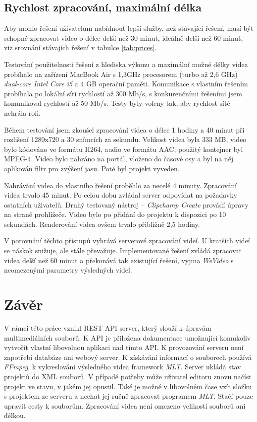 \section{Rychlost zpracování, maximální délka}
Aby mohlo řešení uživatelům nabídnout lepší služby, než stávající řešení, musí být schopné zpracovat video o délce delší než 30 minut, ideálně delší než 60 minut, viz srovnání stávajích řešení v tabulce \ref{tab:prices}.

Testování použitelnosti řešení z hlediska výkonu a maximální možné délky videa probíhalo na zařízení MacBook Air s 1,3GHz procesorem (turbo až 2,6 GHz) \textit{dual-core Intel Core i5} a 4 GB operační paměti. Komunikace s vlastním řešením probíhala po lokální síti rychlostí až 300 Mb/s, s konkurenčními řešeními jsem komunikoval rychlostí až 50 Mb/s. Testy byly voleny tak, aby rychlost sítě nehrála roli.

Během testování jsem zkoušel zpracování videa o délce 1 hodiny a 40 minut při rozlišení 1280x720 a 30 snímcích za sekundu. Velikost videa byla 333 MB, video bylo kódováno ve formátu H264, audio ve formátu AAC, použitý kontejner byl MPEG-4. Video bylo nahráno na portál, vloženo do časové osy a byl na něj aplikován filtr pro zvýšení jasu. Poté byl projekt vyveden.

Nahrávání videa do vlastního řešení proběhlo za necelé 4 minuty. Zpracování videa trvalo 45 minut. Po celou dobu zvládal server odpovídat na požadavky ostatních uživatelů. Druhý testovaný nástroj -- \textit{Clipchamp Create} provádí úpravy na straně prohlížeče. Video bylo po přidání do projektu k dispozici po 10 sekundách. Renderování videa ovšem trvalo přibližně 2,5 hodiny.

V porovnání těchto přístupů vyhrává serverové zpracování videí. U kratších videí se náskok snižuje, ale stále převažuje. Implementované řešení zvládá zpracovat videa delší než 60 minut a překonává tak existující řešení, vyjma \textit{WeVideo} s neomezenými parametry výsledných videí.

\chapter{Závěr}
V rámci této práce vznikl REST API server, který slouží k úpravám multimediálních souborů. K API je přiložena dokumentace umožnující komukoliv vytvořit vlastní libovolnou aplikaci nad tímto API. K provozování serveru není zapotřebí databáze ani webový server. K získávání informací o souborech používá \textit{FFmpeg}, k vykreslování výsledného videa framework \textit{MLT}. Server ukládá stav projektů do XML souborů. V případě potřeby může uživatel editoru znovu načíst projekt ve stavu, v jakém jej opustil. Také je možné v libovolném čase vzít složku s projektem ze serveru a nechat jej ručně zpracovat programem \textit{MLT}. Stačí pouze upravit cesty k souborům. Zpracování videa není omezeno velikostí souborů ani délkou.


